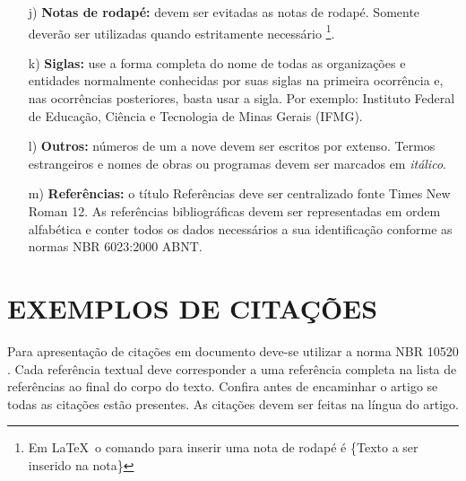 \documentclass{sep}
\begin{document}
\begin{enumerate}
 \item [j)] \textbf{Notas de rodapé:} devem ser evitadas as notas de rodapé.
 Somente deverão ser utilizadas quando estritamente necessário \footnote{Em \LaTeX~o comando para inserir uma nota de rodapé é \{Texto a ser inserido na nota\}}.

 \item [k)] \textbf{Siglas:} use a forma completa do nome de todas as organizações e entidades normalmente conhecidas por suas siglas na
 primeira ocorrência e, nas ocorrências posteriores, basta usar a sigla.
 Por exemplo: Instituto Federal de Educação, Ciência e Tecnologia de Minas Gerais (IFMG).

 \item [l)] \textbf{Outros:} números de um a nove devem ser escritos por extenso.
 Termos estrangeiros e nomes de obras ou programas devem ser marcados em \emph{itálico}.

 \item [m)] \textbf{Referências:} o título Referências deve ser centralizado fonte Times New Roman 12.
 As referências bibliográficas devem ser representadas em ordem alfabética e conter todos os dados necessários a sua identificação conforme as normas NBR 6023:2000 ABNT.
\end{enumerate}

\section{EXEMPLOS DE CITAÇÕES}

Para apresentação de citações em documento deve-se utilizar a norma NBR 10520 \cite{NBR10520}.
Cada referência textual deve corresponder a uma referência completa na lista de referências ao final do corpo do texto.
Confira antes de encaminhar o artigo se todas as citações estão presentes.
As citações devem ser feitas na língua do artigo.
\end{document}
